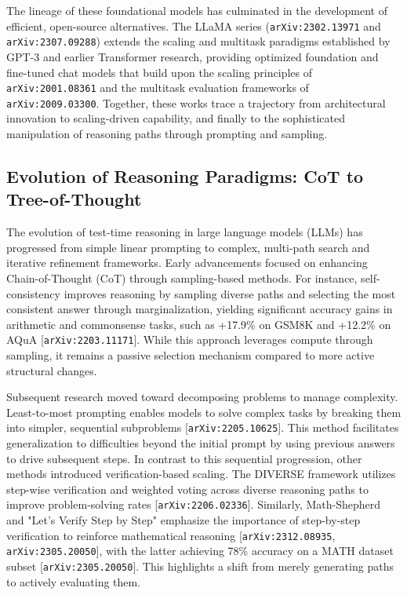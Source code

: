 \documentclass[11pt]{article}
\begin{document}
The lineage of these foundational models has culminated in the development of efficient, open-source alternatives. The LLaMA series (\texttt{arXiv:2302.13971} and \texttt{arXiv:2307.09288}) extends the scaling and multitask paradigms established by GPT-3 and earlier Transformer research, providing optimized foundation and fine-tuned chat models that build upon the scaling principles of \texttt{arXiv:2001.08361} and the multitask evaluation frameworks of \texttt{arXiv:2009.03300}. Together, these works trace a trajectory from architectural innovation to scaling-driven capability, and finally to the sophisticated manipulation of reasoning paths through prompting and sampling.

\subsection{Evolution of Reasoning Paradigms: CoT to Tree-of-Thought}

The evolution of test-time reasoning in large language models (LLMs) has progressed from simple linear prompting to complex, multi-path search and iterative refinement frameworks. Early advancements focused on enhancing Chain-of-Thought (CoT) through sampling-based methods. For instance, self-consistency improves reasoning by sampling diverse paths and selecting the most consistent answer through marginalization, yielding significant accuracy gains in arithmetic and commonsense tasks, such as +17.9\% on GSM8K and +12.2\% on AQuA [\texttt{arXiv:2203.11171}]. While this approach leverages compute through sampling, it remains a passive selection mechanism compared to more active structural changes.

Subsequent research moved toward decomposing problems to manage complexity. Least-to-most prompting enables models to solve complex tasks by breaking them into simpler, sequential subproblems [\texttt{arXiv:2205.10625}]. This method facilitates generalization to difficulties beyond the initial prompt by using previous answers to drive subsequent steps. In contrast to this sequential progression, other methods introduced verification-based scaling. The DIVERSE framework utilizes step-wise verification and weighted voting across diverse reasoning paths to improve problem-solving rates [\texttt{arXiv:2206.02336}]. Similarly, Math-Shepherd and "Let's Verify Step by Step" emphasize the importance of step-by-step verification to reinforce mathematical reasoning [\texttt{arXiv:2312.08935}, \texttt{arXiv:2305.20050}], with the latter achieving 78\% accuracy on a MATH dataset subset [\texttt{arXiv:2305.20050}]. This highlights a shift from merely generating paths to actively evaluating them.
\end{document}
